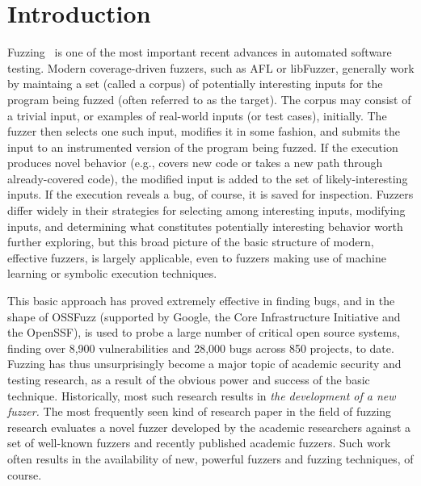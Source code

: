 





\section{Introduction}
\label{sec:intro}

Fuzzing~\cite{fuzzoverview} is one of the most important recent advances in 
automated software testing.  Modern coverage-driven fuzzers, such as AFL or 
libFuzzer, generally work by maintaing a set (called a corpus) of potentially interesting 
inputs for the program being fuzzed (often referred to as the target).  The corpus may consist of a 
trivial input, or examples of real-world inputs (or test cases), initially.  
The fuzzer then selects one such input, modifies it in some fashion, and 
submits the input to an instrumented version of the program being fuzzed.  If 
the execution produces novel behavior (e.g., covers new code or takes a new 
path through already-covered code), the modified input is added to the set of 
likely-interesting inputs.   If the execution reveals a bug, of course, it is 
saved for inspection.   Fuzzers differ widely in their strategies for selecting 
among interesting inputs, modifying inputs, and determining what constitutes 
potentially interesting behavior worth further exploring, but this broad picture of the basic 
structure of modern, effective fuzzers, is largely applicable, even to fuzzers 
making use of machine learning or symbolic execution techniques.

This basic approach has proved extremely effective in finding bugs, and in the 
shape of OSSFuzz (supported by Google, the Core Infrastructure Initiative and 
the OpenSSF), is used to probe a large number of critical open source systems, 
finding over 8,900 vulnerabilities and 28,000 bugs across 850 projects, to date.
Fuzzing has thus unsurprisingly become a major topic of academic security and 
testing research, as a result of the obvious power and success of the basic 
technique.  Historically, most such research results in \emph{the development of a 
new fuzzer.}  The most frequently seen kind of research paper in the field of fuzzing
research evaluates a
novel fuzzer developed by the academic researchers against a set of well-known 
fuzzers and recently published academic fuzzers.  Such work often results in 
the availability of new, powerful fuzzers and fuzzing techniques, of course.  

